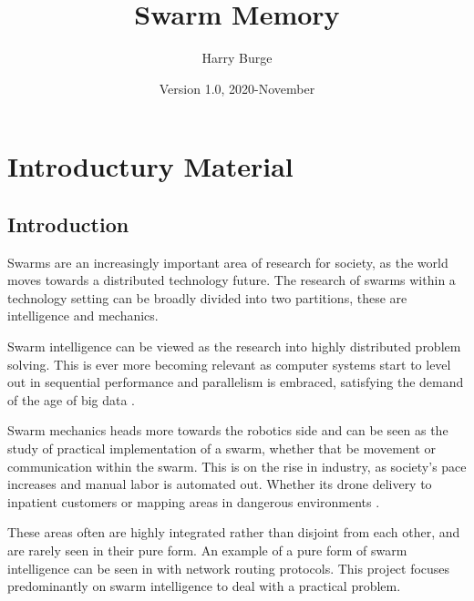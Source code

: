 \documentclass{UoYCSproject}
\author{Harry Burge}
\title{Swarm Memory}
\date{Version 1.0, 2020-November}
\begin{document}
\maketitle
\listoffigures



\begin{summary}

\end{summary}


\chapter{Introductury Material}
\label{cha:Introductury Material}

\section{Introduction}
\label{sec:Introduction}

Swarms are an increasingly important area of research for society, as the world moves towards a distributed technology future.
The research of swarms within a technology setting can be broadly divided into two partitions, these are intelligence and mechanics.

Swarm intelligence can be viewed as the research into highly distributed problem solving\cite{Cognitive maps mine detection, Swarm intellegiegence}.
This is ever more becoming relevant as computer systems start to level out in sequential performance \cite{CPU speed} and parallelism is embraced, satisfying the demand of the age of big data \cite{Avalability storage}.

Swarm mechanics heads more towards the robotics side and can be seen as the study of practical implementation of a swarm, whether that be movement or communication within the swarm.
This is on the rise in industry, as society's pace increases and manual labor is automated out. Whether its drone delivery to inpatient customers or mapping areas in dangerous environments \cite{Swarm robotics reviewed}.

These areas often are highly integrated rather than disjoint from each other, and are rarely seen in their pure form.
An example of a pure form of swarm intelligence can be seen in \cite{Swarm intellegiegence} with network routing protocols.
This project focuses predominantly on swarm intelligence to deal with a practical problem.
\end{document}

